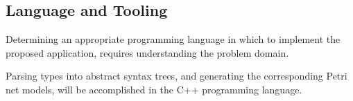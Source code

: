 \documentclass[../Dissertation.tex]{subfiles}
\begin{document}
\subsection{Language and Tooling}
Determining an appropriate programming language in which to implement the proposed application, requires understanding the problem domain. 
\par
Parsing types into abstract syntax trees, and generating the corresponding Petri net models, will be accomplished in the C++ programming language.
\par
\end{document}
